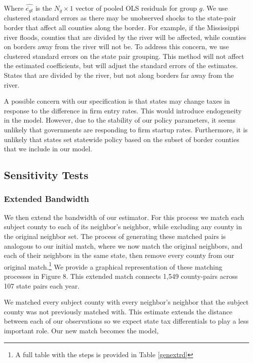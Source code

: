 \documentclass[12pt,a4paper]{article}
\begin{document}
Where $\hat{\ddot{e_{gt}}}$ is the $N_{g} \times 1$ vector of pooled OLS residuals for group $g$. We use clustered standard errors as there may be unobserved shocks to the state-pair border that affect all counties along the border.  For example, if the Mississippi river floods, counties that are divided by the river will be affected, while counties on borders away from the river will not be. To address this concern, we use clustered standard errors on the state pair grouping.  This method will not affect the estimated coefficients, but will adjust the standard errors of the estimates. States that are divided by the river, but not along borders far away from the river.

A possible concern with our specification is that states may change taxes in response to the difference in firm entry rates.  This would introduce endogeneity in the model.  However, due to the stability of our policy parameters, it seems unlikely that governments are responding to firm startup rates.  Furthermore, it is unlikely that states set statewide policy based on the subset of border  counties that we include in our model.

\subsection{Sensitivity Tests}

\subsubsection{Extended Bandwidth}

We then extend the bandwidth of our estimator. For this process we match each subject county to each of its neighbor’s neighbor, while excluding any county in the original neighbor set. The process of generating these matched pairs is analogous to our initial match, where we now match the original neighbors, and each of their neighbors in the same state, then remove every county from our original match.\footnote{A full table with the steps is provided in Table \ref{genextrd}} We provide a graphical representation of these matching processes in Figure 8. This extended match connects 1,549 county-pairs across 107 state pairs each year. 

We matched every subject county with every neighbor's neighbor that the subject county was not previously matched with. This estimate extends the distance between each of our observations so we expect state tax differentials to play a less important role. Our new match becomes the model,
\end{document}
